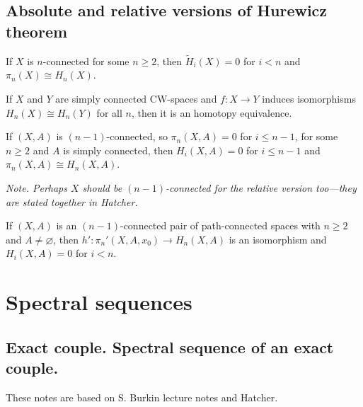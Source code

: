 \subsection{Absolute and relative versions of Hurewicz theorem}
\begin{thm}[Hurewicz]
	If $X$ is $n$-connected for some $n\geq 2$, then $\tilde{H}_{i}(X)=0$ for $i<n$ and $\pi_{n}(X)\cong H_{n}(X)$.
\end{thm}
\begin{coro}
	If $X$ and $Y$ are simply connected CW-spaces and $f:X\to Y$ induces isomorphisms $H_{n}(X)\cong H_{n}(Y)$ for all $n$, then it is an homotopy equivalence.
\end{coro}
\begin{thm}
	If $(X,A)$ is $(n-1)$-connected, so $\pi_{n}(X,A)=0$ for $i\leq n-1$, for some $n\geq 2$ and $A$ is simply connected, then $H_{i}(X,A)=0$ for $i\leq n-1$ and $\pi_{n}(X,A)\cong H_{n}(X,A)$.

	\textit{Note. Perhaps $X$ should be $(n-1)$-connected for the relative version too---they are stated together in Hatcher.}
\end{thm}
\begin{thm}
	If $(X,A)$ is an $(n-1)$-connected pair of path-connected spaces with $n\geq 2$ and $A\neq \varnothing $, then  $h':\pi_{n}'(X,A,x_{0})\to H_{n}(X,A)$ is an isomorphism and $H_{i}(X,A)=0$ for $i<n$.
\end{thm}



\section{Spectral sequences}

\subsection{Exact couple. Spectral sequence of an exact couple.}

These notes are based on S. Burkin lecture notes and Hatcher.

